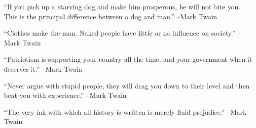 \documentclass{article}%
\begin{document}
\linebreak%
\vspace{1mm}%
\begin{minipage}{\textwidth}%
\flushleft%
“If you pick up a starving dog and make him prosperous, he will not bite you. This is the principal difference between a dog and man.”%
\linebreak%
\vspace{1mm}%
–Mark Twain%
\linebreak%
\vspace{1mm}%
\end{minipage}%
\linebreak%
\vspace{1mm}%
\begin{minipage}{\textwidth}%
\flushleft%
“Clothes make the man. Naked people have little or no influence on society.”%
\linebreak%
\vspace{1mm}%
–Mark Twain%
\linebreak%
\vspace{1mm}%
\end{minipage}%
\linebreak%
\vspace{1mm}%
\begin{minipage}{\textwidth}%
\flushleft%
“Patriotism is supporting your country all the time, and your government when it deserves it.”%
\linebreak%
\vspace{1mm}%
–Mark Twain%
\linebreak%
\vspace{1mm}%
\end{minipage}%
\linebreak%
\vspace{1mm}%
\begin{minipage}{\textwidth}%
\flushleft%
“Never argue with stupid people, they will drag you down to their level and then beat you with experience.”%
\linebreak%
\vspace{1mm}%
–Mark Twain%
\linebreak%
\vspace{1mm}%
\end{minipage}%
\linebreak%
\vspace{1mm}%
\begin{minipage}{\textwidth}%
\flushleft%
“The very ink with which all history is written is merely fluid prejudice.”%
\linebreak%
\vspace{1mm}%
–Mark Twain%
\linebreak%
\vspace{1mm}%
\end{minipage}%
\end{document}
